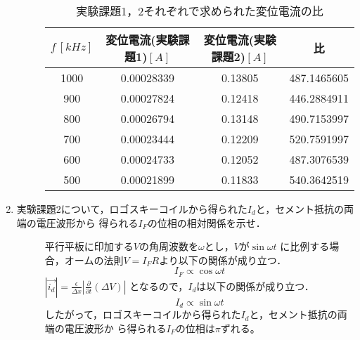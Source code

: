 \begin{enumerate}
\begin{description}
        
        \begin{table}[H]
            \centering
            \caption{実験課題1，2それぞれで求められた変位電流の比}
            \begin{tabular}{c|cc|c}
                \hline
                $f\,[\si{kHz}]$ & 変位電流(実験課題1)$[\si{A}]$ & 変位電流(実験課題2)$[\si{A}]$ & 比 \\ \hline
                1000 & 0.00028339 & 0.13805 & 487.1465605 \\ 
                900 & 0.00027824 & 0.12418 & 446.2884911 \\ 
                800 & 0.00026794 & 0.13148 & 490.7153997 \\ 
                700 & 0.00023444 & 0.12209 & 520.7591997 \\ 
                600 & 0.00024733 & 0.12052 & 487.3076539 \\ 
                500 & 0.00021899 & 0.11833 & 540.3642519 \\ \hline
            \end{tabular}
        \end{table}
    \end{description}
    
\newpage

    \item 実験課題2について，ロゴスキーコイルから得られた$I_d$と，セメント抵抗の両端の電圧波形から
    得られる$I_F$の位相の相対関係を示せ．
    \begin{description}
        \item[] 平行平板に印加する$V$の角周波数を$\omega$とし，$V$が$\sin \omega t$
        に比例する場合，オームの法則$V=I_F R$より以下の関係が成り立つ．
        $$
        I_F\propto\cos\omega t
        $$
        $|\vec{i_d}|=\frac{\epsilon}{\Delta x}|\frac{\partial}{\partial t}(\Delta V)|$
        となるので，$I_d$は以下の関係が成り立つ．
        $$
        I_d\propto\sin \omega t
        $$
        したがって，ロゴスキーコイルから得られた$I_d$と，セメント抵抗の両端の電圧波形か
        ら得られる$I_F$の位相は$\pi$ずれる。

    \end{description}


\end{enumerate}
